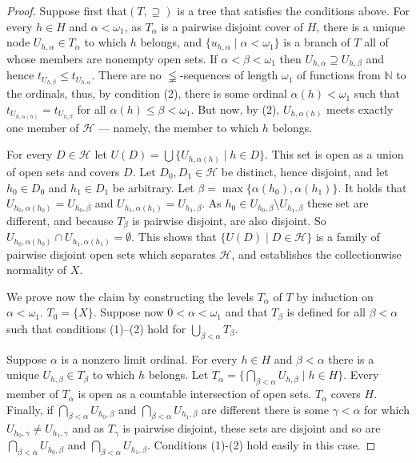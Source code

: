 \documentclass{amsart}
\theoremstyle{remark}
\renewcommand\mid{\mathrel{|}\allowbreak}
\begin{document}
\begin{proof}
Suppose first that\((T,\supseteq)\) is a tree that satisfies the conditions above.
For every \(h\in H\) and \(\alpha<\omega_{1}\), as \(T_{\alpha}\) is a pairwise disjoint cover of
\(H\), there is a unique node \(U_{h,\alpha}\in T_{\alpha}\) to which \(h\) belongs, and
\(\{u_{h,\alpha}\mid \alpha<\omega_{1}\}\) is a branch of \(T\) all of whose members are nonempty
open sets. If \(\alpha<\beta<\omega_{1}\) then \(U_{h,\alpha}\supseteq U_{h,\beta}\) and hence
\(t_{U_{h,\beta}}\le t_{U_{h,\alpha}}\).  There are no \(\lneqq\)-sequences of length \(\omega_{1}\) of functions from \(\mathbb N\) to the ordinals,
   thus, by condition (2), there is some ordinal \(\alpha(h)<\omega_{1}\) such that
   \(t_{U_{h,\alpha(h)}}=t_{U_{h,\beta}}\) for all \(\alpha(h)\le \beta<\omega_{1}\). But now, by (2),
   \(U_{h,\alpha(h)}\) meets exactly one member of \(\mathcal H\) --- namely, the
   member to which \(h\) belongs.

   For every \(D\in \mathcal H\) let \(U(D)=\bigcup\{U_{h,\alpha(h)}\mid h\in D\}\). This set is
   open as a union of open sets and covers \(D\). Let \(D_{0},D_{1}\in \mathcal H\)
   be distinct, hence disjoint, and let \(h_{0}\in D_{0}\) and \(h_1\in D_{1}\) be arbitrary. Let
   \(\beta=\max\{\alpha(h_{0}),\alpha(h_{1})\}\). It holds that
   \(U_{h_{0},\alpha(h_{0})}=U_{h_{0},\beta}\) and \(U_{h_{1},\alpha(h_{1})}=U_{h_{1},\beta}\). As
   \(h_{0}\in U_{h_{0},\beta}\setminus U_{h_{1},\beta}\) these set are different, and because
   \(T_{\beta}\)
   is pairwise disjoint, are also disjoint. So
   \(U_{h_0,\alpha(h_{0})}\cap U_{h_1,\alpha(h_{1})}=\emptyset\). This shows that
   \(\{U(D)\mid D\in \mathcal H \}\) is a family of pairwise disjoint open sets which
   separates \(\mathcal H\), and establishes the collectionwise normality of \(X\).

   We prove now the claim by constructing  the levels \(T_{\alpha}\) of \(T\) by
   induction on \(\alpha<\omega_{1}\). \(T_{0}=\{X\}\).
Suppose now \(0<\alpha<\omega_{1}\) and that \(T_{\beta}\) is defined for all \(\beta<\alpha\) such
that conditions (1)--(2) hold for \(\bigcup_{\beta<\alpha}T_{\beta}\).

Suppose  \(\alpha\) is a nonzero limit ordinal. For every \(h\in H\) and \(\beta<\alpha\) there is a
unique \(U_{h,\beta}\in T_{\beta}\) to which \(h\) belongs. Let
\(T_{\alpha}=\{\bigcap_{\beta<\alpha}U_{h,\beta}\mid h\in H\}\). Every member of \(T_{\alpha}\) is open as a
countable intersection of open sets. \(T_{\alpha}\) covers \(H\). Finally, if
\(\bigcap_{\beta<\alpha}U_{h_{0},\beta}\) and \(\bigcap_{\beta<\alpha}U_{h_{1},\beta}\) are different there is
    some \(\gamma<\alpha\) for which \(U_{h_{0},\gamma}\not=U_{h_{1},\gamma}\) and as \(T_{\gamma}\)
    is pairwise disjoint, these sets are disjoint and so are
     \(\bigcap_{\beta<\alpha}U_{h_{0},\beta}\) and \(\bigcap_{\beta<\alpha}U_{h_{1},\beta}\). Conditions (1)-(2) hold
     easily in this case.


\end{proof}
\end{document}
